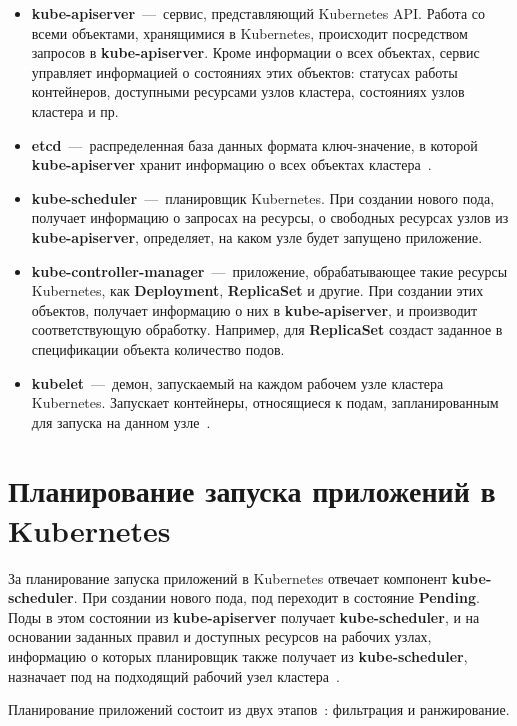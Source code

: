 \begin{itemize}
	\item \textbf{kube-apiserver}~---~сервис, представляющий Kubernetes API. Работа со всеми объектами, хранящимися в Kubernetes, происходит посредством запросов в \textbf{kube-apiserver}. Кроме информации о всех объектах, сервис управляет информацией о состояниях этих объектов: статусах работы контейнеров, доступными ресурсами узлов кластера, состояниях узлов кластера и пр.
	\item \textbf{etcd}~---~распределенная база данных формата ключ-значение, в которой \textbf{kube-apiserver} хранит информацию о всех объектах кластера~\cite{etcd}.
	\item \textbf{kube-scheduler}~---~планировщик Kubernetes. При создании нового пода, получает информацию о запросах на ресурсы, о свободных ресурсах узлов из \textbf{kube-apiserver}, определяет, на каком узле будет запущено приложение.
	\item \textbf{kube-controller-manager}~---~приложение, обрабатывающее такие ресурсы Kubernetes, как \textbf{Deployment}, \textbf{ReplicaSet} и другие. При создании этих объектов, получает информацию о них в \textbf{kube-apiserver}, и производит соответствующую обработку. Например, для \textbf{ReplicaSet} создаст заданное в спецификации объекта количество подов.
	\item \textbf{kubelet}~---~демон, запускаемый на каждом рабочем узле кластера Kubernetes. Запускает контейнеры, относящиеся к подам, запланированным для запуска на данном узле~\cite{kubelet}.
\end{itemize}

\section{Планирование запуска приложений в Kubernetes}

За планирование запуска приложений в Kubernetes отвечает компонент \textbf{kube-scheduler}. При создании нового пода, под переходит в состояние \textbf{Pending}. Поды в этом состоянии из \textbf{kube-apiserver} получает \textbf{kube-scheduler}, и на основании заданных правил и доступных ресурсов на рабочих узлах, информацию о которых планировщик также получает из \textbf{kube-scheduler}, назначает под на подходящий рабочий узел кластера~\cite{schduler}.

Планирование приложений состоит из двух этапов~\cite{carrion2022kubernetes}\cite{rejiba2022custom}: фильтрация и ранжирование. 

